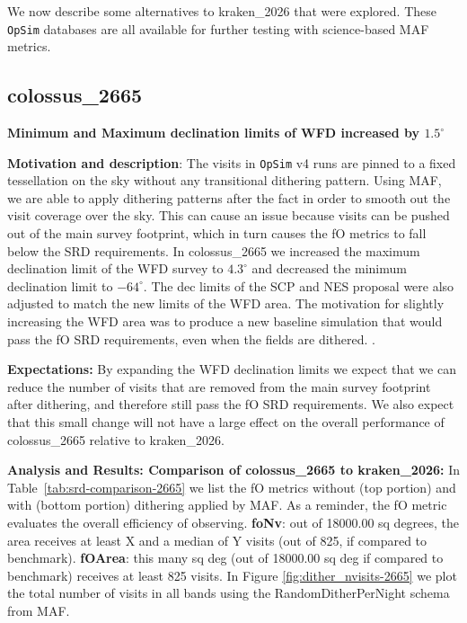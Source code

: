 \documentclass[DM,authoryear,toc]{lsstdoc}
\newcommand{\opsim}{\texttt{OpSim}\xspace}
\begin{document}
We now describe some alternatives to kraken\_2026 that were explored.
These \opsim databases are all available for further testing with science-based MAF metrics.

\subsection{colossus\_2665} \label{colossus2665}

\textbf{Minimum and Maximum declination limits of WFD increased by $1.5^{\circ}$}

\textbf{Motivation and description}: The visits in \opsim v4 runs are pinned to a fixed tessellation on the sky without any transitional dithering pattern.
Using MAF, we are able to apply dithering patterns after the fact in order to smooth out the visit coverage over the sky. This can cause an issue because
visits can be pushed out of the main survey footprint, which in turn causes the fO metrics to fall below the SRD requirements. In colossus\_2665
we increased the maximum declination limit of the WFD survey to $4.3^{\circ}$ and decreased the minimum declination limit to $-64^{\circ}$. The dec
limits of the SCP and NES proposal were also adjusted to match the new limits of the WFD area. The motivation for slightly increasing the WFD
area was to produce a new baseline simulation that would pass the fO SRD requirements, even when the fields are dithered. .


\textbf{Expectations:} By expanding the WFD declination limits we expect that we can reduce the number of visits that are removed from
the main survey footprint after dithering, and therefore still pass the fO SRD requirements. We also expect that this small change will not have a large
effect on the overall performance of colossus\_2665 relative to kraken\_2026.

\textbf{Analysis and Results: Comparison of colossus\_2665 to kraken\_2026:} In Table~\ref{tab:srd-comparison-2665} we list the
fO metrics without (top portion) and with (bottom portion) dithering applied by MAF. As a reminder, the fO metric evaluates the overall
efficiency of observing. \textbf{foNv}: out of 18000.00 sq degrees, the area receives at least X and  a median of Y visits (out of 825,
if compared to benchmark). \textbf{fOArea}: this many sq deg (out of 18000.00 sq deg if compared to benchmark) receives at least 825 visits.
In Figure \autoref{fig:dither_nvisits-2665} we plot the total number of visits in all bands using the RandomDitherPerNight schema from MAF.
\end{document}
